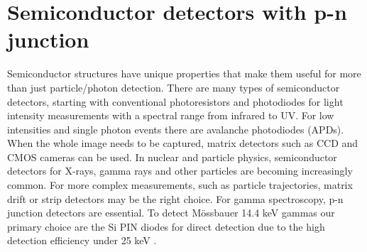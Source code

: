 
\chapter{Semiconductor detectors with p-n junction}
Semiconductor structures have unique properties that make them useful for more than just particle/photon detection. There are many types of semiconductor detectors, starting with conventional photoresistors and photodiodes for light intensity measurements with a spectral range from infrared to UV. For low intensities and single photon events there are avalanche photodiodes (APDs). When the whole image needs to be captured, matrix detectors such as CCD and CMOS cameras can be used. In nuclear and particle physics, semiconductor detectors for X-rays, gamma rays and other particles are becoming increasingly common. For more complex measurements, such as particle trajectories, matrix drift or strip detectors may be the right choice. For gamma spectroscopy, p-n junction detectors are essential. To detect Mössbauer 14.4 keV gammas our primary choice are the Si PIN diodes for direct detection due to the high detection efficiency under 25 keV \cite{SiCdTe}. 



